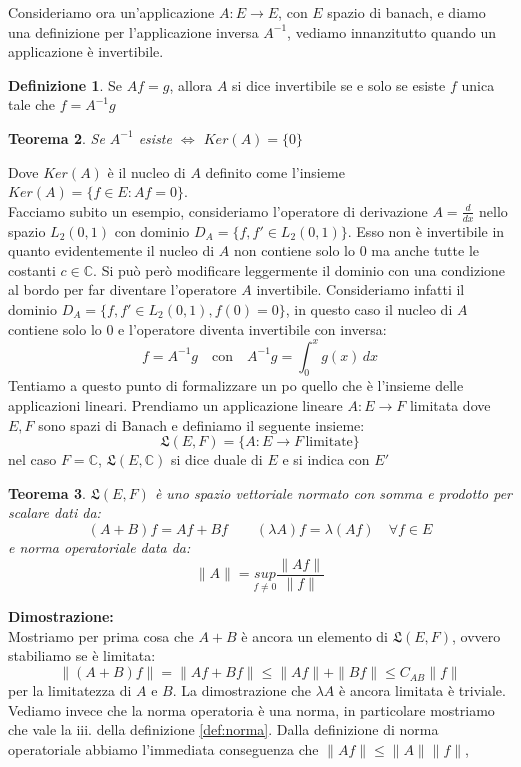 \documentclass[12pt]{book}
\theoremstyle{plain}
\newcommand{\C}{\mathbb{C}}
\newtheorem{thm}{Teorema}[section]
\theoremstyle{definition}
\newtheorem{dfn}[thm]{Definizione}
\theoremstyle{remark}
\begin{document}
Consideriamo ora un'applicazione $A:E\to E$, con $E$ spazio di banach, e diamo una definizione per l'applicazione inversa $A^{-1}$, vediamo innanzitutto quando un applicazione è invertibile.
\begin{dfn}
Se $Af=g$, allora $A$ si dice invertibile se e solo se esiste $f$ unica tale che $f = A^{-1}g$
\end{dfn}
\begin{thm}
Se $A^{-1}$ esiste $\iff$ $Ker(A) = \{0\}$
\end{thm}
\hspace{-1.6em}Dove $Ker(A)$ è il nucleo di $A$ definito come l'insieme $Ker(A)= \{f\in E:Af=0\}$.\\
Facciamo subito un esempio, consideriamo l'operatore di derivazione $A = \frac{d}{dx}$ nello spazio $L_2(0,1)$ con dominio $D_A=\{f,f'\in L_2(0,1)\}$.
Esso non è invertibile in quanto evidentemente il nucleo di $A$ non contiene solo lo $0$ ma anche tutte le costanti $c\in \C$. Si può però modificare leggermente il dominio con una condizione al bordo per far diventare l'operatore $A$ invertibile. Consideriamo infatti il dominio $D_A =\{f,f'\in L_2(0,1),f(0)=0\}$, in questo caso il nucleo di $A$ contiene solo lo $0$ e l'operatore diventa invertibile con inversa:
\[f = A^{-1}g\quad\text{con}\quad A^{-1}g = \int_0^xg(x)\,dx\]
Tentiamo a questo punto di formalizzare un po quello che è l'insieme delle applicazioni lineari. Prendiamo un applicazione lineare $A:E\to F$ limitata dove $E,F$ sono spazi di Banach e definiamo il seguente insieme:
\[\mathfrak{L}(E,F) =\{A:E\to F\, \text{limitate}\}\]
nel caso $F=\C$, $\mathfrak{L}(E,\C)$ si dice duale di $E$ e si indica con $E'$
\begin{thm}
$\mathfrak{L}(E,F)$ è uno spazio vettoriale normato con somma e prodotto per scalare dati da:
\[(A+B)f = Af+Bf \qquad (\lambda A)f = \lambda (Af) \quad \forall f\in E\]
e norma operatoriale data da:
\[\|A\| = \underset{f\neq0}{sup}\frac{\|Af\|}{\|f\|}\]
\end{thm}
\hspace{-1.6em}\textbf{Dimostrazione:}\\
Mostriamo per prima cosa che $A+B$ è ancora un elemento di $\mathfrak{L}(E,F)$, ovvero stabiliamo se è limitata:
\[\|(A+B)f\| = \|Af+Bf\| \leq \|Af\| + \|Bf\| \leq C_{AB}\|f\|\]
per la limitatezza di $A$ e $B$. La dimostrazione che $\lambda A$ è ancora limitata è triviale. Vediamo invece che la norma operatoria è una norma, in particolare mostriamo che vale la iii. della definizione \eqref{def:norma}. Dalla definizione di norma operatoriale abbiamo l'immediata conseguenza che $\|Af\|\leq \|A\|\|f\|$,
\end{document}
